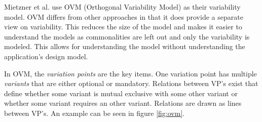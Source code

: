 Mietzner et al. \cite{mietzner2009variability} use OVM (Orthogonal Variability Model) as their variability model. OVM differs from other approaches in that it does provide a separate view on variability. This reduces the size of the model and makes it easier to understand the models as commonalities are left out and only the variability is modeled. This allows for understanding the model without understanding the application's design model.

In OVM, the \textit{variation points} are the key items. One variation point has multiple \textit{variants} that are either optional or mandatory. Relations between VP's exist that define whether some variant is mutual exclusive with some other variant or whether some variant requires an other variant. Relations are drawn as lines between VP's. An example can be seen in figure \ref{fig:ovm}.





